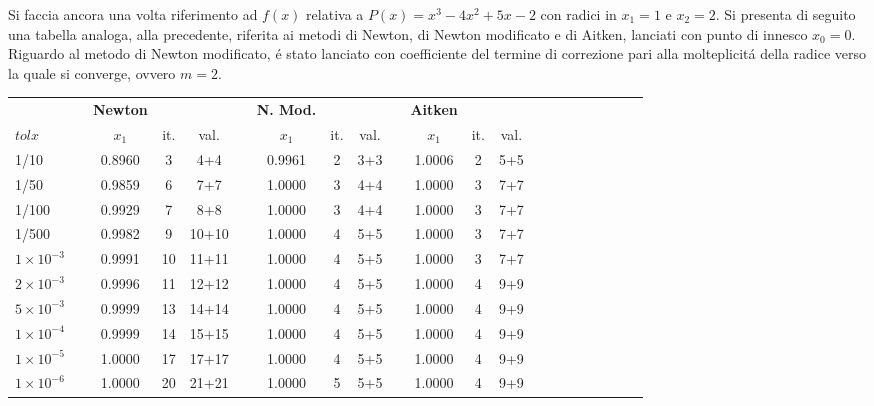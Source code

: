 \begin{center}
\footnotesize\noindent{}\end{center}

\noindent Si faccia ancora una volta riferimento ad \(f(x)\) relativa a \(P(x)=x^3 - 4x^2 + 5x - 2\) con radici in \(x_1=1\) e \(x_2=2\). Si presenta di seguito una tabella analoga, alla precedente, riferita ai metodi di Newton, di Newton modificato e di Aitken, lanciati con punto di innesco \(x_0 = 0\). Riguardo al metodo di Newton modificato, \'e stato lanciato con coefficiente del termine di correzione pari alla molteplicit\'a della radice verso la quale si converge, ovvero \(m = 2\).\\

\small\begin{tabular}{l*{20}{c}}
 & \vline& \textbf{Newton} & & & \vline& \textbf{N. Mod.} & & & \vline& \textbf{Aitken} \\
 \(tolx\) & \vline& \(x_1\)   & it. & val. & \vline& \(x_1\)   & it. & val.  &\vline& \(x_1\)  & it.& val. \\
\hline
 1/10                   & \vline&  0.8960 & 3	& 4+4  & \vline& 0.9961 & 2 & 3+3 & \vline& 1.0006 & 2  & 5+5\\
 1/50                   & \vline&  0.9859 & 6	& 7+7  & \vline& 1.0000 & 3 & 4+4 & \vline& 1.0000 & 3  & 7+7\\
 1/100                   & \vline& 0.9929 & 7	& 8+8  & \vline& 1.0000 & 3 & 4+4 & \vline& 1.0000 & 3  & 7+7\\
 1/500                   & \vline& 0.9982 & 9	& 10+10& \vline& 1.0000 & 4 & 5+5 & \vline& 1.0000 & 3  & 7+7\\
 \(1 \times 10^{-3}\) & \vline&    0.9991 & 10	& 11+11& \vline& 1.0000 & 4 & 5+5 & \vline& 1.0000 & 3  & 7+7\\
 \(2 \times 10^{-3}\) & \vline&    0.9996 & 11	& 12+12& \vline& 1.0000 & 4 & 5+5 & \vline& 1.0000 & 4  & 9+9\\
 \(5 \times 10^{-3}\) & \vline&    0.9999 & 13	& 14+14& \vline& 1.0000 & 4 & 5+5 & \vline& 1.0000 & 4  & 9+9\\
 \(1 \times 10^{-4}\) & \vline&    0.9999 & 14	& 15+15& \vline& 1.0000 & 4 & 5+5 & \vline& 1.0000 & 4  & 9+9\\
 \(1 \times 10^{-5}\) & \vline&    1.0000 & 17	& 17+17& \vline& 1.0000 & 4 & 5+5 & \vline& 1.0000 & 4  & 9+9\\
 \(1 \times 10^{-6}\) & \vline&    1.0000 & 20 	& 21+21& \vline& 1.0000 & 5 & 5+5 & \vline& 1.0000 & 4  & 9+9\\
\end{tabular} \\
\\

